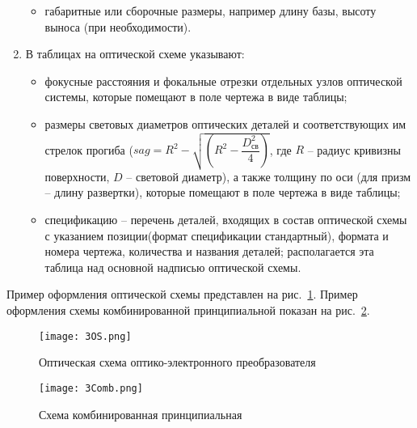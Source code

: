 \begin{enumerate}
\begin{itemize}
		\item габаритные или сборочные размеры, например длину базы, высоту выноса (при необходимости).
	\end{itemize}
	\item В таблицах на оптической схеме указывают:
	\begin{itemize}
		\item фокусные расстояния и фокальные отрезки отдельных узлов оптической системы, которые помещают в поле чертежа в виде таблицы;
		\item  размеры световых диаметров оптических деталей и соответствующих им стрелок прогиба ($ sag = R^2 - \sqrt{(R^2 - \dfrac{D^2_\text{св}}{4})} $, где $ R $ -- радиус кривизны поверхности, $ D $ -- световой диаметр), а также толщину по оси (для призм -- длину развертки), которые помещают в поле чертежа в виде таблицы; 
		\item спецификацию -- перечень деталей, входящих в состав оптической схемы с указанием позиции(формат спецификации стандартный), формата и номера чертежа, количества и названия деталей; 
		располагается эта таблица над основной надписью оптической схемы.
		\end{itemize}
\end{enumerate}

Пример оформления оптической схемы представлен на рис.~\ref{pic:3OS}. Пример оформления схемы комбинированной принципиальной показан на рис.~\ref{pic:3Comb}.

\begin{figure}[H]
	\caption{Оптическая схема оптико-электронного преобразователя}
	\texttt{[image: 3OS.png]}
	\label{pic:3OS}
\end{figure}

\begin{landscape}
	\begin{figure}[h!]
		\caption{Схема комбинированная принципиальная}
		\texttt{[image: 3Comb.png]}
		\label{pic:3Comb}
	\end{figure}
\end{landscape}
